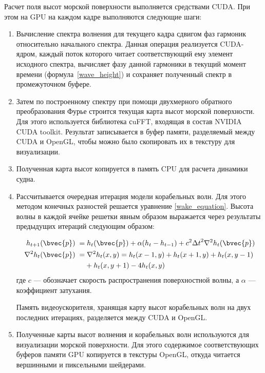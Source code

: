 Расчет поля высот морской поверхности выполняется средствами CUDA. При этом на GPU на каждом кадре выполняются следующие шаги:

\begin{enumerate}
\item Вычисление спектра волнения для текущего кадра сдвигом фаз гармоник относительно начального спектра. Данная операция реализуется CUDA-ядром, каждый поток которого читает соответствующий ему элемент исходного спектра, вычисляет фазу данной гармоники в текущий момент времени (формула~\ref{wave_height}) и сохраняет полученный спектр в промежуточном буфере.

\item Затем по построенному спектру при помощи двухмерного обратного преобразования Фурье строится текущая карта высот морской поверхности. Для этого используется библиотека сuFFT, входящая в состав NVIDIA CUDA toolkit. Результат записывается в буфер памяти, разделяемый между CUDA и OpenGL, чтобы можно было скопировать их в текстуру для визуализации.

\item Полученная карта высот копируется в память CPU для расчета динамики судна.

\item Рассчитывается очередная итерация модели корабельных волн. Для этого методом конечных разностей решается уравнение \ref{wake_equation}. Высота волны в каждой ячейке решетки явным образом выражается через результаты предыдущих итераций следующим образом: 

\begin{equation}
\begin{split}
h_{t+1}(\bvec{p}) \; =& \; h_t(\bvec{p}) + \alpha(h_t - h_{t-1}) +
c^2{\Delta t}^2 \nabla^2 h_t(\bvec{p}) \\
\nabla^2 h_t(\bvec{p}) \; =& \; \nabla^2 h_t(x, y) = 
h_t(x-1, y) + h_t(x+1, y) + h_t(x, y-1) \\ &+ h_t(x, y+1) - 4 h_t(x, y)
\end{split}
\end{equation}
где $c$ --- обозначает скорость распространения поверхностной волны, а $\alpha$ --- коэффициент затухания.

Память видеоускорителя, хранящая карту высот корабельных волн на двух последних итерациях, разделяется между CUDA и OpenGL.

\item Полученные карты высот волнения и корабельных волн используются для визуализации морской поверхности. Для этого содержимое соответствующих буферов памяти GPU копируется в текстуры OpenGL, откуда читается вершинными и пиксельными шейдерами.

\end{enumerate}



